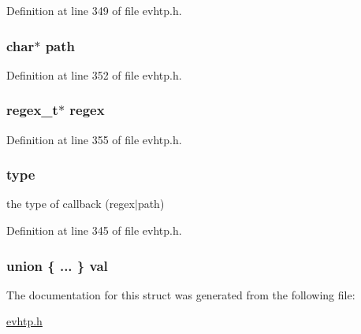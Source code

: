 Definition at line 349 of file evhtp.\-h.

\hypertarget{structevhtp__callback__s_a44196e6a5696d10442c29e639437196e}{
\subsubsection[{path}]{\setlength{\rightskip}{0pt plus 5cm}char$\ast$ path}}\label{structevhtp__callback__s_a44196e6a5696d10442c29e639437196e}


Definition at line 352 of file evhtp.\-h.

\hypertarget{structevhtp__callback__s_af71a3fad7fee5d731252ce89e56f948f}{
\subsubsection[{regex}]{\setlength{\rightskip}{0pt plus 5cm}regex\-\_\-t$\ast$ regex}}\label{structevhtp__callback__s_af71a3fad7fee5d731252ce89e56f948f}


Definition at line 355 of file evhtp.\-h.

\hypertarget{structevhtp__callback__s_a6da94264a51bd354aca3d22098a2aee5}{
\subsubsection[{type}]{ type}}\label{structevhtp__callback__s_a6da94264a51bd354aca3d22098a2aee5}
the type of callback (regex$\vert$path) 

Definition at line 345 of file evhtp.\-h.

\hypertarget{structevhtp__callback__s_a46fe687f5d6aa04ca3260318f08188b4}{
\subsubsection[{val}]{\setlength{\rightskip}{0pt plus 5cm}union \{ ... \}   val}}\label{structevhtp__callback__s_a46fe687f5d6aa04ca3260318f08188b4}


The documentation for this struct was generated from the following file\-:\begin{DoxyCompactItemize}
\item 
\hyperlink{evhtp_8h}{evhtp.\-h}\end{DoxyCompactItemize}
